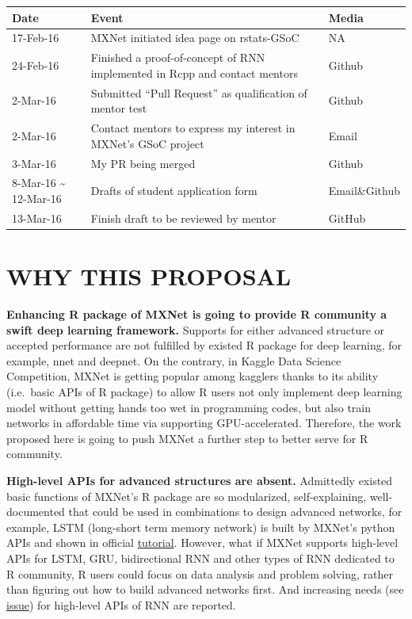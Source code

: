 \documentclass[]{article}
\begin{document}
\begin{longtable}[c]{@{}lll@{}}
\toprule
Date & Event & Media\tabularnewline
\midrule
\endhead
17-Feb-16 & MXNet initiated idea page on rstats-GSoC & NA\tabularnewline
24-Feb-16 & Finished a proof-of-concept of RNN implemented in Rcpp and
contact mentors & Github\tabularnewline
2-Mar-16 & Submitted ``Pull Request'' as qualification of mentor test &
Github\tabularnewline
2-Mar-16 & Contact mentors to express my interest in MXNet's GSoC
project & Email\tabularnewline
3-Mar-16 & My PR being merged & Github\tabularnewline
8-Mar-16 \textasciitilde{} 12-Mar-16 & Drafts of student application
form & Email\&Github\tabularnewline
13-Mar-16 & Finish draft to be reviewed by mentor &
GitHub\tabularnewline
\bottomrule
\end{longtable}

\section{WHY THIS PROPOSAL}\label{why-this-proposal}

\textbf{Enhancing R package of MXNet is going to provide R community a
swift deep learning framework.} Supports for either advanced structure
or accepted performance are not fulfilled by existed R package for deep
learning, for example, nnet and deepnet. On the contrary, in Kaggle Data
Science Competition, MXNet is getting popular among kagglers thanks to
its ability (i.e.~basic APIs of R package) to allow R users not only
implement deep learning model without getting hands too wet in
programming codes, but also train networks in affordable time via
supporting GPU-accelerated. Therefore, the work proposed here is going
to push MXNet a further step to better serve for R community.

\textbf{High-level APIs for advanced structures are absent.} Admittedly
existed basic functions of MXNet's R package are so modularized,
self-explaining, well-documented that could be used in combinations to
design advanced networks, for example, LSTM (long-short term memory
network) is built by MXNet's python APIs and shown in official
\href{https://github.com/Puriney/mxnet/tree/master/example/rnn}{tutorial}.
However, what if MXNet supports high-level APIs for LSTM, GRU,
bidirectional RNN and other types of RNN dedicated to R community, R
users could focus on data analysis and problem solving, rather than
figuring out how to build advanced networks first. And increasing needs
(see \href{https://github.com/dmlc/mxnet/issues/837}{issue}) for
high-level APIs of RNN are reported.
\end{document}
